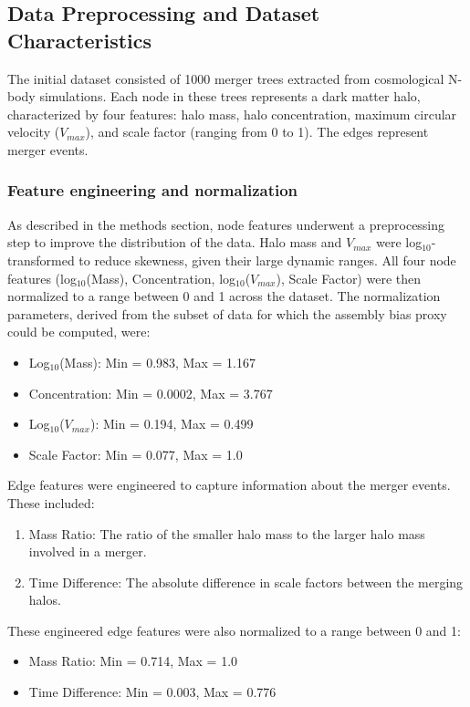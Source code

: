 \documentclass[twocolumn]{aastex631}
\begin{document}
\subsection{Data Preprocessing and Dataset Characteristics}

The initial dataset consisted of 1000 merger trees extracted from cosmological N-body simulations. Each node in these trees represents a dark matter halo, characterized by four features: halo mass, halo concentration, maximum circular velocity ($V_{max}$), and scale factor (ranging from 0 to 1). The edges represent merger events.

\subsubsection{Feature engineering and normalization}
As described in the methods section, node features underwent a preprocessing step to improve the distribution of the data. Halo mass and $V_{max}$ were log$_{10}$-transformed to reduce skewness, given their large dynamic ranges. All four node features (log$_{10}$(Mass), Concentration, log$_{10}$($V_{max}$), Scale Factor) were then normalized to a range between 0 and 1 across the dataset. The normalization parameters, derived from the subset of data for which the assembly bias proxy could be computed, were:
\begin{itemize}
    \item Log$_{10}$(Mass): Min = 0.983, Max = 1.167
    \item Concentration: Min = 0.0002, Max = 3.767
    \item Log$_{10}$($V_{max}$): Min = 0.194, Max = 0.499
    \item Scale Factor: Min = 0.077, Max = 1.0
\end{itemize}

Edge features were engineered to capture information about the merger events. These included:
\begin{enumerate}
    \item Mass Ratio: The ratio of the smaller halo mass to the larger halo mass involved in a merger.
    \item Time Difference: The absolute difference in scale factors between the merging halos.
\end{enumerate}
These engineered edge features were also normalized to a range between 0 and 1:
\begin{itemize}
    \item Mass Ratio: Min = 0.714, Max = 1.0
    \item Time Difference: Min = 0.003, Max = 0.776
\end{itemize}
\end{document}
